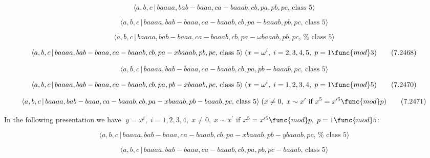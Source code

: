 \documentclass[10pt]{article}
\begin{document}
\begin{equation}
\langle a,b,c\,|\,baaaa,bab-baaa,ca-baaab,cb,pa,pb,pc,\,\text{class }5\rangle
\tag{7.2465}
\end{equation}

\begin{equation}
\langle a,b,c\,|\,baaaa,bab-baaa,ca-baaab,cb,pa-baaab,pb,pc,\,\text{class }%
5\rangle  \tag{7.2466}
\end{equation}

\begin{equation}
\langle a,b,c\,|\,baaaa,bab-baaa,ca-baaab,cb,pa-\omega baaab,pb,pc,\,\text{%
class }5\rangle  \tag{7.2467}
\end{equation}

\begin{equation}
\langle a,b,c\,|\,baaaa,bab-baaa,ca-baaab,cb,pa-xbaaab,pb,pc,\,\text{class }%
5\rangle \;(x=\omega ^{i},\;i=2,3,4,5,\;p=1\func{mod}3)  \tag{7.2468}
\end{equation}

\begin{equation}
\langle a,b,c\,|\,baaaa,bab-baaa,ca-baaab,cb,pa,pb-baaab,pc,\,\text{class }%
5\rangle  \tag{7.2469}
\end{equation}

\begin{equation}
\langle a,b,c\,|\,baaaa,bab-baaa,ca-baaab,cb,pa,pb-xbaaab,pc,\,\text{class }%
5\rangle \;(x=\omega ^{i},\;i=1,2,3,4,\;p=1\func{mod}5)  \tag{7.2470}
\end{equation}

\begin{equation}
\langle a,b,c\,|\,baaaa,bab-baaa,ca-baaab,cb,pa-xbaaab,pb-baaab,pc,\,\text{%
class }5\rangle \;(x\neq 0,\;x\sim x^{\prime }\text{ if }x^{5}=x^{\prime 5}%
\func{mod}p)  \tag{7.2471}
\end{equation}

In the following presentation we have $\;y=\omega ^{i},\;i=1,2,3,4,\;x\neq
0,\;x\sim x^{\prime }$ if $x^{5}=x^{\prime 5}\func{mod}p,\;p=1\func{mod}5$:

\begin{equation}
\langle a,b,c\,|\,baaaa,bab-baaa,ca-baaab,cb,pa-xbaaab,pb-ybaaab,pc,\,\text{%
class }5\rangle  \tag{7.2472}
\end{equation}

\begin{equation}
\langle a,b,c\,|\,baaaa,bab-baaa,ca-baaab,cb,pa,pb,pc-baaab,\,\text{class }%
5\rangle  \tag{7.2473}
\end{equation}
\end{document}
